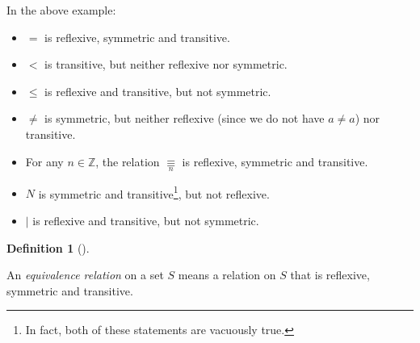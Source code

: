 \documentclass[numbers=enddot,12pt,final,onecolumn,notitlepage]{scrartcl}%
\numberwithin{exer}{subsection}
\theoremstyle{definition}
\newtheorem{defi}[theo]{Definition}
\newenvironment{definition}[1][]
{\begin{defi}[#1]\begin{leftbar}}
{\end{leftbar}\end{defi}}
\begin{document}
In the above example:

\begin{itemize}
\item $=$ is reflexive, symmetric and transitive.

\item $<$ is transitive, but neither reflexive nor symmetric.

\item $\leq$ is reflexive and transitive, but not symmetric.

\item $\neq$ is symmetric, but neither reflexive (since we do not have $a\neq
a$) nor transitive.

\item For any $n\in\mathbb{Z}$, the relation $\underset{n}{\equiv}$ is
reflexive, symmetric and transitive.

\item $N$ is symmetric and transitive\footnote{In fact, both of these
statements are vacuously true.}, but not reflexive.

\item $\mid$ is reflexive and transitive, but not symmetric.
\end{itemize}

\begin{definition}
An \textit{equivalence relation} on a set $S$ means a relation on $S$ that is
reflexive, symmetric and transitive.
\end{definition}
\end{document}
